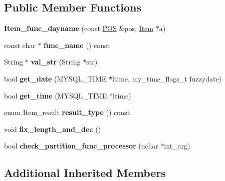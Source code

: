 \subsection*{Public Member Functions}
\begin{DoxyCompactItemize}
\item 
\mbox{\label{classItem__func__dayname_ab912b994ba8c640c9ec41dee8af75a86}} 
{\bfseries Item\+\_\+func\+\_\+dayname} (const \mbox{\hyperlink{structYYLTYPE}{P\+OS}} \&pos, \mbox{\hyperlink{classItem}{Item}} $\ast$a)
\item 
\mbox{\label{classItem__func__dayname_adbb8cf5126377e7b248a5306826d20b0}} 
const char $\ast$ {\bfseries func\+\_\+name} () const
\item 
\mbox{\label{classItem__func__dayname_ac2f820eae5db23ae2a8cf4637db7df0d}} 
String $\ast$ {\bfseries val\+\_\+str} (String $\ast$str)
\item 
\mbox{\label{classItem__func__dayname_a2f3f806c4177cc490d8106024ef3e08f}} 
bool {\bfseries get\+\_\+date} (M\+Y\+S\+Q\+L\+\_\+\+T\+I\+ME $\ast$ltime, my\+\_\+time\+\_\+flags\+\_\+t fuzzydate)
\item 
\mbox{\label{classItem__func__dayname_a1ecdd973b31efcc4e4ac6b1ab627fb29}} 
bool {\bfseries get\+\_\+time} (M\+Y\+S\+Q\+L\+\_\+\+T\+I\+ME $\ast$ltime)
\item 
\mbox{\label{classItem__func__dayname_aebdd815e5ab393bce9c2af2294ab8481}} 
enum Item\+\_\+result {\bfseries result\+\_\+type} () const
\item 
\mbox{\label{classItem__func__dayname_a3ded021b460bb25948ceaf55c1693162}} 
void {\bfseries fix\+\_\+length\+\_\+and\+\_\+dec} ()
\item 
\mbox{\label{classItem__func__dayname_abbc544c1e58bdc7d3cda784b8697db96}} 
bool {\bfseries check\+\_\+partition\+\_\+func\+\_\+processor} (uchar $\ast$int\+\_\+arg)
\end{DoxyCompactItemize}
\subsection*{Additional Inherited Members}


